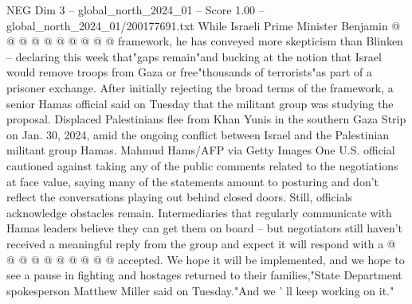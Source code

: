 \begin{textsample}{NEG Dim 3 – global\_north\_2024\_01 – Score 1.00 – global\_north\_2024\_01/200177691.txt}
While Israeli Prime Minister Benjamin @ @ @ @ @ @ @ @ @ @ framework, he has conveyed more skepticism than Blinken -- declaring this week that"gaps remain"and bucking at the notion that Israel would remove troops from Gaza or free"thousands of terrorists"as part of a prisoner exchange.
After initially rejecting the broad terms of the framework, a senior Hamas official said on Tuesday that the militant group was studying the proposal.
Displaced Palestinians flee from Khan Yunis in the southern Gaza Strip on Jan. 30, 2024, amid the ongoing conflict between Israel and the Palestinian militant group Hamas.
Mahmud Hams/AFP via Getty Images One U.S. official cautioned against taking any of the public comments related to the negotiations at face value, saying many of the statements amount to posturing and don't reflect the conversations playing out behind closed doors.
Still, officials acknowledge obstacles remain.
Intermediaries that regularly communicate with Hamas leaders believe they can get them on board -- but negotiators still haven't received a meaningful reply from the group and expect it will respond with a @ @ @ @ @ @ @ @ @ @ accepted.
We hope it will be implemented, and we hope to see a pause in fighting and hostages returned to their families,"State Department spokesperson Matthew Miller said on Tuesday."And we ' ll keep working on it."

\end{textsample}
